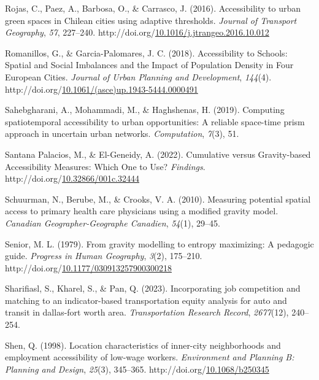 \documentclass[
11pt, %
oneside, %
english, %
singlespacing, %
]{macthesis} %
\newlength{\cslhangindent}
\newenvironment{CSLReferences}[2] %
{\begin{list}{}{%
	\setlength{\itemindent}{0pt}
	\setlength{\leftmargin}{0pt}
	\setlength{\parsep}{0pt}
	\ifodd #1
	\setlength{\leftmargin}{\cslhangindent}
	\setlength{\itemindent}{-1\cslhangindent}
	\fi
	\setlength{\itemsep}{#2\baselineskip}}}
{\end{list}}
\begin{document}
\begin{CSLReferences}{1}{0}
Rojas, C., Paez, A., Barbosa, O., \& Carrasco, J. (2016). Accessibility to urban green spaces in {Chilean} cities using adaptive thresholds. \emph{Journal of Transport Geography}, \emph{57}, 227--240. http://doi.org/\href{https://doi.org/10.1016/j.jtrangeo.2016.10.012}{10.1016/j.jtrangeo.2016.10.012}

Romanillos, G., \& Garcia-Palomares, J. C. (2018). Accessibility to {Schools}: {Spatial} and {Social} {Imbalances} and the {Impact} of {Population} {Density} in {Four} {European} {Cities}. \emph{Journal of Urban Planning and Development}, \emph{144}(4). http://doi.org/\href{https://doi.org/10.1061/(asce)up.1943-5444.0000491}{10.1061/(asce)up.1943-5444.0000491}

Sahebgharani, A., Mohammadi, M., \& Haghshenas, H. (2019). Computing spatiotemporal accessibility to urban opportunities: A reliable space-time prism approach in uncertain urban networks. \emph{Computation}, \emph{7}(3), 51.

Santana Palacios, M., \& El-Geneidy, A. (2022). Cumulative versus Gravity-based Accessibility Measures: Which One to Use? \emph{Findings}. http://doi.org/\href{https://doi.org/10.32866/001c.32444}{10.32866/001c.32444}

Schuurman, N., Berube, M., \& Crooks, V. A. (2010). Measuring potential spatial access to primary health care physicians using a modified gravity model. \emph{Canadian Geographer-Geographe Canadien}, \emph{54}(1), 29--45.

Senior, M. L. (1979). From gravity modelling to entropy maximizing: A pedagogic guide. \emph{Progress in Human Geography}, \emph{3}(2), 175--210. http://doi.org/\href{https://doi.org/10.1177/030913257900300218}{10.1177/030913257900300218}

Sharifiasl, S., Kharel, S., \& Pan, Q. (2023). Incorporating job competition and matching to an indicator-based transportation equity analysis for auto and transit in dallas-fort worth area. \emph{Transportation Research Record}, \emph{2677}(12), 240--254.

Shen, Q. (1998). Location characteristics of inner-city neighborhoods and employment accessibility of low-wage workers. \emph{Environment and Planning B: Planning and Design}, \emph{25}(3), 345--365. http://doi.org/\href{https://doi.org/10.1068/b250345}{10.1068/b250345}


\end{CSLReferences}
\end{document}
